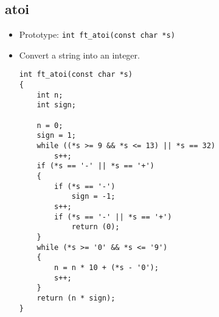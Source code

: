 \documentclass{article}
\begin{document}
	\subsection{atoi}
		\begin{itemize}[label=$\rightarrow$]
			\item Prototype: \texttt{int ft\_atoi(const char *s)                                                      
}
			\item Convert a string into an integer.
			\begin{verbatim}
int ft_atoi(const char *s)                                                      
{                                                                               
    int n;                                                                      
    int sign;                                                                   
                                                                                
    n = 0;                                                                      
    sign = 1;                                                                   
    while ((*s >= 9 && *s <= 13) || *s == 32)                                   
        s++;                                                                    
    if (*s == '-' || *s == '+')                                                 
    {                                                                           
        if (*s == '-')                                                          
            sign = -1;                                                          
        s++;                                                                    
        if (*s == '-' || *s == '+')                                             
            return (0);                                                         
    }                                                                           
    while (*s >= '0' && *s <= '9')                                              
    {                                                                           
        n = n * 10 + (*s - '0');                                                
        s++;                                                                    
    }                                                                           
    return (n * sign);                                                          
}  
			\end{verbatim}
		\end{itemize}
	
\end{document}
